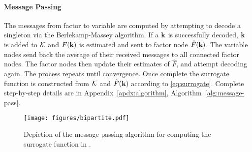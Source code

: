 \paragraph{Message Passing} The messages from factor to variable are computed by attempting to decode a singleton via the Berlekamp-Massey algorithm. If a $\mathbf k$ is successfully decoded, $\mathbf k$ is added to $\mathcal K$ and $F(\mathbf k)$ is estimated and sent to factor node $\hat{F}(\mathbf k)$. 
%
The variable nodes send back the average of their received messages to all connected factor nodes. The factor nodes then update their estimates of $\hat{F}$, and attempt decoding again.
%
The process repeats until convergence. Once complete the surrogate function is constructed from $\mathcal K$ and $\hat{F}(\mathbf k)$ according to \eqref{eq:surrogate}. 
%
Complete step-by-step details are in Appendix~\ref{apdx:algorithm}, Algorithm~\ref{alg:message-pass}.

\begin{figure}[h]
    \centering
    \texttt{[image: figures/bipartite.pdf]}
    \caption{Depiction of the message passing algorithm for computing the surrogate function in \SpecExp{}.}%
    \label{fig:bipartite}
\end{figure}







